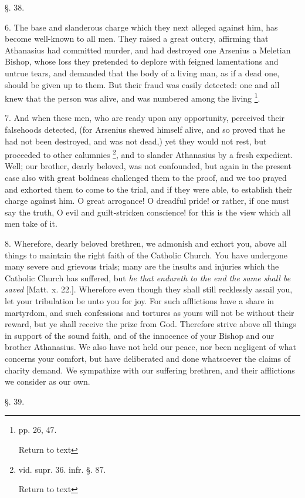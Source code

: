 §. 38.

6. The base and slanderous charge which they next
alleged against him, has become well-known to all men. They raised a
great outcry, affirming that Athanasius had committed murder, and had
destroyed one Arsenius a Meletian Bishop, whose loss they
pretended to deplore with feigned lamentations and untrue tears, and
demanded that the body of a living man, as if a dead one, should be
given up to them. But their fraud was easily detected: one and all
knew that the person was alive, and was numbered among the living \footnote{pp. 26, 47.

Return to text}.

7. And when these men, who are ready upon any
opportunity, perceived their falsehoods detected, (for Arsenius shewed
himself alive, and so proved that he had not been destroyed, and was
not dead,) yet they would not rest, but proceeded to other calumnies \footnote{vid. supr. 36. infr. §. 87.

Return to text}, and to slander Athanasius by a fresh expedient. Well; our
brother, dearly beloved, was not confounded, but again in the present
case also with great boldness challenged them to the proof, and we too
prayed and exhorted them to come to the trial, and if they were able,
to establish their charge against him. O great arrogance! O dreadful
pride! or rather, if one must say the truth, O evil and guilt-stricken
conscience! for this is the view which all men take of it.

8. Wherefore, dearly beloved brethren, we
admonish and exhort you, above all things to maintain the right faith
of the Catholic Church. You have undergone many severe and grievous
trials; many are the insults and injuries which the Catholic Church
has suffered, but \emph{he that endureth to the end the same shall be
saved} [Matt. x. 22.]. Wherefore even though they shall still
recklessly assail you, let your tribulation be unto you for joy. For
such afflictions have a share in martyrdom, and such confessions and
tortures as yours will not be without their reward, but ye shall
receive the prize from God. Therefore strive above all things in
support of the sound faith, and of the innocence of your Bishop and
our brother Athanasius. We also have not held our peace, nor been
negligent of what concerns your comfort, but have deliberated and done
whatsoever the claims of charity demand. We sympathize with our
suffering brethren, and their afflictions we consider as our own.

§. 39.

